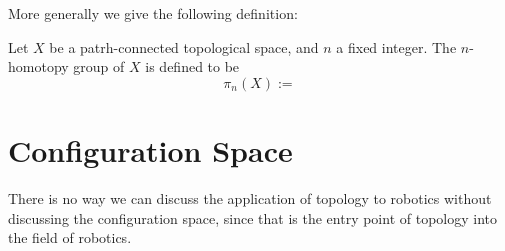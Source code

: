 More generally we give the following definition:

\begin{defn}
   Let $X$ be a patrh-connected topological space, and $n$ a fixed integer. The $n$-homotopy group of $X$ is defined to be 
   \[  
      \pi_n(X) := 
   \]
\end{defn}

\section{Configuration Space}
There is no way we can discuss the application of topology to robotics without discussing the configuration space, since that is the entry point of topology into the field of robotics.
